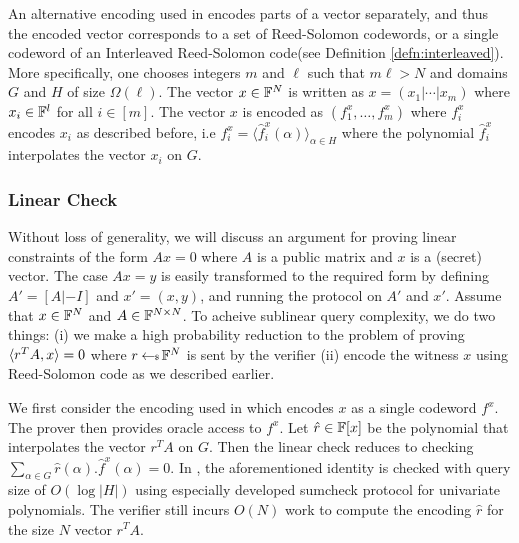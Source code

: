An alternative encoding used in \cite{Ligero2017} encodes parts of a vector
separately, and thus the encoded vector corresponds to a set of Reed-Solomon
codewords, or a single codeword of an Interleaved Reed-Solomon code(see
Definition \ref{defn:interleaved}). More specifically, one chooses integers $m$
and $\ell$ such that $m\ell > N$ and domains $G$ and $H$ of size
$\Omega(\ell)$. The vector $x\in \mathbb{F}^N$ is written as
$x=(x_1|\cdots|x_m)$ where $x_i\in \mathbb{F}^l$ for all $i\in [m]$. The vector $x$ is
encoded as $(f^x_1,\ldots,f^x_m)$ where $f^x_i$ encodes $x_i$ as described
before, i.e $f^x_i=\langle \hat{f}^x_i(\alpha)\rangle_{\alpha\in H}$ where the
polynomial $\hat{f}^x_i$ interpolates the vector $x_i$ on $G$. 

\subsubsection{Linear Check}
Without loss of generality, we will discuss an argument for proving linear constraints
of the form $Ax=0$ where $A$ is a public matrix and $x$ is a (secret) vector. The
case $Ax=y$ is easily transformed to the required form by defining
$A'=[A|-I]$ and $x'=(x,y)$, and running the protocol on $A'$ and
$x'$. Assume that $x\in \mathbb{F}^N$ and $A\in \mathbb{F}^{N\times N}$. To acheive sublinear query
complexity, we do two things: (i) we make a high probability reduction to the
problem of proving $\langle r^TA,x\rangle=0$ where $r\hskip2.3pt{\gets\!\!\mbox{\tiny${\$}$\normalsize}}\, \mathbb{F}^N$ is sent by
the verifier (ii) encode the witness $x$ using Reed-Solomon code as
we described earlier.

We first consider the encoding used in \cite{Aurora} which encodes $x$ as a
single codeword $f^x$. The prover then provides oracle access to $f^x$. Let
$\hat{r}\in\mathbb{F}[x]$ be the polynomial that interpolates the vector $r^TA$ on $G$.
Then the linear check reduces to checking $\sum_{\alpha\in
G}\hat{r}(\alpha).\hat{f}^x(\alpha) = 0$. In \cite{Aurora}, the aforementioned
identity is checked with query size of $O(\log|H|)$ using especially developed
sumcheck protocol for univariate polynomials. The verifier still incurs $O(N)$
work to compute the encoding $\hat{r}$ for the size $N$ vector $r^TA$. 

